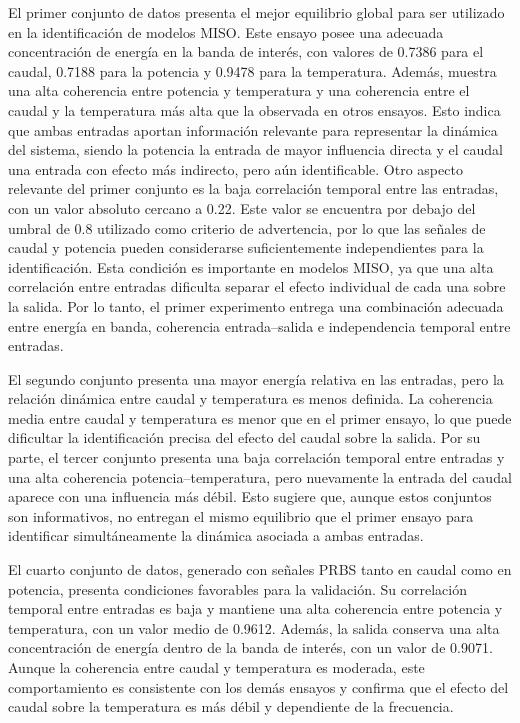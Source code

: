 \documentclass[11pt]{report}
\begin{document}
El primer conjunto de datos presenta el mejor equilibrio global para ser utilizado en la identificación de modelos MISO. Este ensayo posee una adecuada concentración de energía en la banda de interés, con valores de 0.7386 para el caudal, 0.7188 para la potencia y 0.9478 para la temperatura. Además, muestra una alta coherencia entre potencia y temperatura y una coherencia entre el caudal y la temperatura más alta que la observada en otros ensayos. Esto indica que ambas entradas aportan información relevante para representar la dinámica del sistema, siendo la potencia la entrada de mayor influencia directa y el caudal una entrada con efecto más indirecto, pero aún identificable. Otro aspecto relevante del primer conjunto es la baja correlación temporal entre las entradas, con un valor absoluto cercano a 0.22. Este valor se encuentra por debajo del umbral de 0.8 utilizado como criterio de advertencia, por lo que las señales de caudal y potencia pueden considerarse suficientemente independientes para la identificación. Esta condición es importante en modelos MISO, ya que una alta correlación entre entradas dificulta separar el efecto individual de cada una sobre la salida. Por lo tanto, el primer experimento entrega una combinación adecuada entre energía en banda, coherencia entrada–salida e independencia temporal entre entradas.

El segundo conjunto presenta una mayor energía relativa en las entradas, pero la relación dinámica entre caudal y temperatura es menos definida. La coherencia media entre caudal y temperatura es menor que en el primer ensayo, lo que puede dificultar la identificación precisa del efecto del caudal sobre la salida. Por su parte, el tercer conjunto presenta una baja correlación temporal entre entradas y una alta coherencia potencia–temperatura, pero nuevamente la entrada del caudal aparece con una influencia más débil. Esto sugiere que, aunque estos conjuntos son informativos, no entregan el mismo equilibrio que el primer ensayo para identificar simultáneamente la dinámica asociada a ambas entradas.

El cuarto conjunto de datos, generado con señales PRBS tanto en caudal como en potencia, presenta condiciones favorables para la validación. Su correlación temporal entre entradas es baja y mantiene una alta coherencia entre potencia y temperatura, con un valor medio de 0.9612. Además, la salida conserva una alta concentración de energía dentro de la banda de interés, con un valor de 0.9071. Aunque la coherencia entre caudal y temperatura es moderada, este comportamiento es consistente con los demás ensayos y confirma que el efecto del caudal sobre la temperatura es más débil y dependiente de la frecuencia.
\end{document}
